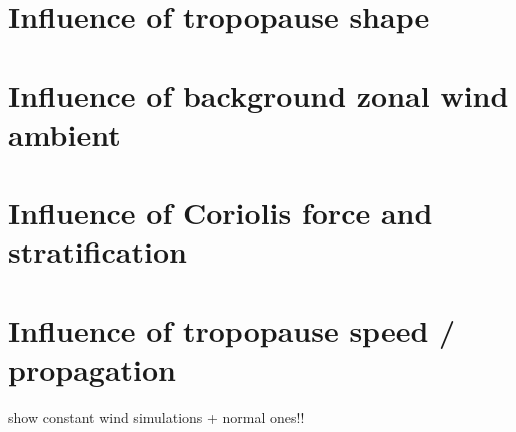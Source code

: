 \section{Influence of tropopause shape}

\section{Influence of background zonal wind ambient}

\section{Influence of Coriolis force and stratification}

\section{Influence of tropopause speed / propagation}

show constant wind simulations + normal ones!!